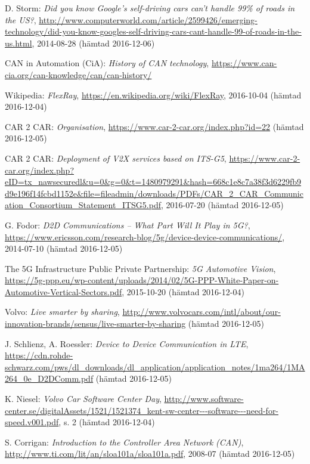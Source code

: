 \documentclass[a4paper]{IEEEtran}
\begin{document}
\begin{thebibliography}{77}
	D. Storm: \emph{Did you know Google's self-driving cars can't handle 99\% of roads in the US?},
	\url{http://www.computerworld.com/article/2599426/emerging-technology/did-you-know-googles-self-driving-cars-cant-handle-99-of-roads-in-the-us.html},
	2014-08-28 (hämtad 2016-12-06)
	
	CAN in Automation (CiA): \emph{History of CAN technology},
	\url{https://www.can-cia.org/can-knowledge/can/can-history/}
	
	Wikipedia: \emph{FlexRay},
	\url{https://en.wikipedia.org/wiki/FlexRay},
	2016-10-04 (hämtad 2016-12-04)
	
	CAR 2 CAR: \emph{Organisation},
	\url{https://www.car-2-car.org/index.php?id=22}
	(hämtad 2016-12-05)
	
	CAR 2 CAR: \emph{Deployment of V2X services based on ITS-G5},
	\url{https://www.car-2-car.org/index.php?eID=tx_nawsecuredl&u=0&g=0&t=1480979291&hash=668c1e8c7a38f3d6229fb9d9e196f14fcbd1152e&file=fileadmin/downloads/PDFs/CAR_2_CAR_Communication_Consortium_Statement_ITSG5.pdf},
	2016-07-20 (hämtad 2016-12-05)
	
	G. Fodor: \emph{D2D Communications – What Part Will It Play in 5G?},
	\url{https://www.ericsson.com/research-blog/5g/device-device-communications/},
	2014-07-10 (hämtad 2016-12-05)
	
	The 5G Infrastructure Public Private Partnership: \emph{5G Automotive Vision},
	\url{https://5g-ppp.eu/wp-content/uploads/2014/02/5G-PPP-White-Paper-on-Automotive-Vertical-Sectors.pdf},
	2015-10-20 (hämtad 2016-12-04)
	
	Volvo: \emph{Live smarter by sharing},
	\url{http://www.volvocars.com/intl/about/our-innovation-brands/sensus/live-smarter-by-sharing}
	(hämtad 2016-12-05)
	
	J. Schlienz, A. Roessler: \emph{Device to Device Communication in LTE},
	\url{https://cdn.rohde-schwarz.com/pws/dl_downloads/dl_application/application_notes/1ma264/1MA264_0e_D2DComm.pdf}
	(hämtad 2016-12-05)
	
	K. Niesel: \emph{Volvo Car Software Center Day}, 
	\url{http://www.software-center.se/digitalAssets/1521/1521374_kent-sw-center---software---need-for-speed.v001.pdf},
	s. 2 (hämtad 2016-12-04)
	
	S. Corrigan: \emph{Introduction to the Controller Area Network (CAN)},
	\url{http://www.ti.com/lit/an/sloa101a/sloa101a.pdf},
	2008-07 (hämtad 2016-12-05)
	

\end{thebibliography}
\end{document}
